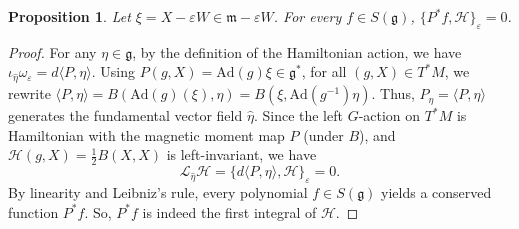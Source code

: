 \documentclass[11pt]{amsart}
\newtheorem{proposition}[theorem]{Proposition}
\theoremstyle{definition}
\theoremstyle{plain}
\theoremstyle{conclusion}
\begin{document}

\begin{proposition} \label{prop:leftintegrals}
Let $\xi = X -\varepsilon W \in \mathfrak{m} -\varepsilon W$. For every $f\in S(\mathfrak{g})$, $ \{P^*f,  \mathcal{H}\}_\varepsilon = 0$. 
\end{proposition}

\begin{proof}
For any $\eta \in \mathfrak{g}$, by the definition of the Hamiltonian action, we have $\iota_{\hat{\eta}} \omega_\varepsilon = d \langle P,\eta \rangle$. Using $P(g,X) = \mathrm{Ad}(g)\xi \in \mathfrak{g}^*$, for all $(g,X) \in T^*M$, we rewrite $\langle P,\eta \rangle = B(\mathrm{Ad}(g)(\xi),\eta) = B(\xi, \mathrm{Ad}(g^{-1})\eta) $. Thus, $P_\eta = \langle P,\eta \rangle$ generates the fundamental vector field $\hat{\eta}$. Since the left $G$-action on $T^*M$ is Hamiltonian with the magnetic moment map $P$ (under $B$), and $\mathcal{H}(g,X)=\frac{1}{2} B(X,X)$ is left-invariant, we have $$\mathcal{L}_{\hat{\eta}}\mathcal{H} = \{d \langle P,\eta \rangle, \mathcal{H}\}_\varepsilon =  0.$$   By linearity and Leibniz's rule, every polynomial $f\in S(\mathfrak{g})$ yields a conserved function $P^*f$. So, $P^*f$ is indeed the first integral of $\mathcal{H}$.
\end{proof}
\end{document}
